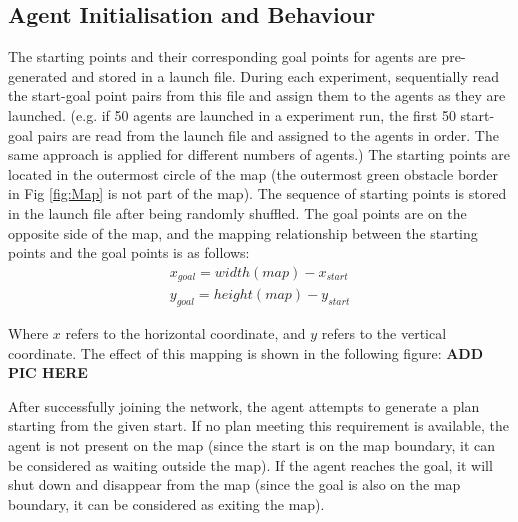 \subsection*{Agent Initialisation and Behaviour}
The starting points and their corresponding goal points for agents are pre-generated and stored in a launch file. 
During each experiment, sequentially read the start-goal point pairs from this file and assign them to the agents as they are launched.
(e.g. if 50 agents are launched in a experiment run, the first 50 start-goal pairs are read from the launch file and assigned to the agents in order. The same approach is applied for different numbers of agents.)
The starting points are located in the outermost circle of the map (the outermost green obstacle border in Fig \ref{fig:Map} is not part of the map). The sequence of starting points is stored in the launch file after being randomly shuffled.
The goal points are on the opposite side of the map, and the mapping relationship between the starting points and the goal points is as follows:
\begin{align}
    x_{goal} = width(map) - x_{start}  \\
    y_{goal} = height(map) - y_{start} 
\end{align}

Where $x$ refers to the horizontal coordinate, and $y$ refers to the vertical coordinate.
The effect of this mapping is shown in the following figure:
\textbf{ADD PIC HERE} %

After successfully joining the network, the agent attempts to generate a plan starting from the given start. If no plan meeting this requirement is available, the agent is not present on the map (since the start is on the map boundary, it can be considered as waiting outside the map).
If the agent reaches the goal, it will shut down and disappear from the map (since the goal is also on the map boundary, it can be considered as exiting the map).

